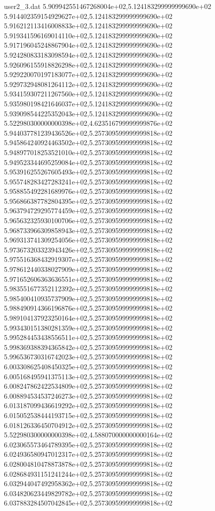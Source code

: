 \begin{filecontents}{user2_3.dat}
5.909942551467268004e+02,5.124183299999999690e+02
5.914402359154929627e+02,5.124183299999999690e+02
5.916212113416008833e+02,5.124183299999999690e+02
5.919341596169014110e+02,5.124183299999999690e+02
5.917196045248867904e+02,5.124183299999999690e+02
5.924280833183098594e+02,5.124183299999999690e+02
5.926096155918826298e+02,5.124183299999999690e+02
5.929220070197183077e+02,5.124183299999999690e+02
5.929732948081264112e+02,5.124183299999999690e+02
5.934159307211267560e+02,5.124183299999999690e+02
5.935980198421646037e+02,5.124183299999999690e+02
5.939098544225352043e+02,5.124183299999999690e+02
5.522980300000000398e+02,4.623516799999999876e+02
5.944037781239436526e+02,5.257309599999999818e+02
5.945864240924463502e+02,5.257309599999999818e+02
5.948977018253521010e+02,5.257309599999999818e+02
5.949523344695259084e+02,5.257309599999999818e+02
5.953916255267605493e+02,5.257309599999999818e+02
5.955748283427283241e+02,5.257309599999999818e+02
5.958855492281689976e+02,5.257309599999999818e+02
5.956866387782804395e+02,5.257309599999999818e+02
5.963794729295774459e+02,5.257309599999999818e+02
5.965632325930100706e+02,5.257309599999999818e+02
5.968733966309858943e+02,5.257309599999999818e+02
5.969313741309254056e+02,5.257309599999999818e+02
5.973673203323943426e+02,5.257309599999999818e+02
5.975516368432919307e+02,5.257309599999999818e+02
5.978612440338027909e+02,5.257309599999999818e+02
5.971652606363636551e+02,5.257309599999999818e+02
5.983551677352112392e+02,5.257309599999999818e+02
5.985400410935737909e+02,5.257309599999999818e+02
5.988490914366196876e+02,5.257309599999999818e+02
5.989104137923250164e+02,5.257309599999999818e+02
5.993430151380281359e+02,5.257309599999999818e+02
5.995284453438556511e+02,5.257309599999999818e+02
5.998369388394365842e+02,5.257309599999999818e+02
5.996536730316742023e+02,5.257309599999999818e+02
6.003308625408450325e+02,5.257309599999999818e+02
6.005168495941375113e+02,5.257309599999999818e+02
6.008247862422534809e+02,5.257309599999999818e+02
6.008894534537246273e+02,5.257309599999999818e+02
6.013187099436619292e+02,5.257309599999999818e+02
6.015052538444193715e+02,5.257309599999999818e+02
6.018126336450704912e+02,5.257309599999999818e+02
5.522980300000000398e+02,4.588070000000000164e+02
6.023065573464789395e+02,5.257309599999999818e+02
6.024936580947012317e+02,5.257309599999999818e+02
6.028004810478873878e+02,5.257309599999999818e+02
6.028684931151241244e+02,5.257309599999999818e+02
6.032944047492958362e+02,5.257309599999999818e+02
6.034820623449829782e+02,5.257309599999999818e+02
6.037883284507042845e+02,5.257309599999999818e+02

\end{filecontents}
